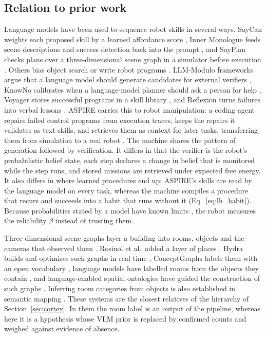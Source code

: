 \subsection{Relation to prior work}
\label{sec:lang_hierarchy:related}

Language models have been used to sequence robot skills in several ways. SayCan weights each proposed skill by a
learned affordance score \cite{ahn2022saycan}, Inner Monologue feeds scene descriptions and success detection back
into the prompt \cite{huang2022inner}, and SayPlan checks plans over a three-dimensional scene graph in a simulator
before execution \cite{rana2023sayplan}. Others bias object search \cite{zhou2023esc} or write robot programs
\cite{liang2023code, singh2023progprompt}. LLM-Modulo frameworks argue that a language model should
generate candidates for external verifiers \cite{kambhampati2024llmmodulo}, KnowNo calibrates when a language-model
planner should ask a person for help \cite{ren2023knowno}, Voyager stores successful programs in a skill library
\cite{wang2023voyager}, and Reflexion turns failures into verbal lessons \cite{shinn2023reflexion}. ASPIRE carries
this to robot manipulation: a coding agent repairs failed control programs from execution traces, keeps the repairs
it validates as text skills, and retrieves them as context for later tasks, transferring them from simulation to a
real robot \cite{lu2026aspire}. The machine shares the pattern of generation followed by verification. It differs in
that the verifier is the robot's probabilistic belief state, each step declares a change in belief that is
monitored while the step runs, and stored missions are retrieved under expected free energy. It also differs in
where learned procedures end up: ASPIRE's skills are read by the language model on every task, whereas the
machine compiles a procedure that recurs and succeeds into a habit that runs without it (Eq.~\eqref{eq:lh_habit}). Because probabilities stated by a model have known limits
\cite{tian2023just, xiong2024can}, the robot measures the reliability $\beta$ instead of trusting them.

Three-dimensional scene graphs layer a building into rooms, objects and the cameras that observed them
\cite{armeni2019scene}. Rosinol et al.\ added a layer of places \cite{rosinol2020dynamic}, Hydra builds
and optimises such graphs in real time \cite{hughes2022hydra}, ConceptGraphs labels them with an open vocabulary \cite{gu2024conceptgraphs},
language models have labelled rooms from the objects they contain \cite{chen2022leveraging}, and language-enabled
spatial ontologies have guided the construction of such graphs \cite{strader2024indoor}. Inferring room categories
from objects is also established in semantic mapping \cite{pronobis2012large}. These systems are the closest relatives
of the hierarchy of Section~\ref{sec:cortex}. In them the room label is an output of the pipeline, whereas here it is a
hypothesis whose VLM prior is replaced by confirmed counts and weighed against evidence of absence.

